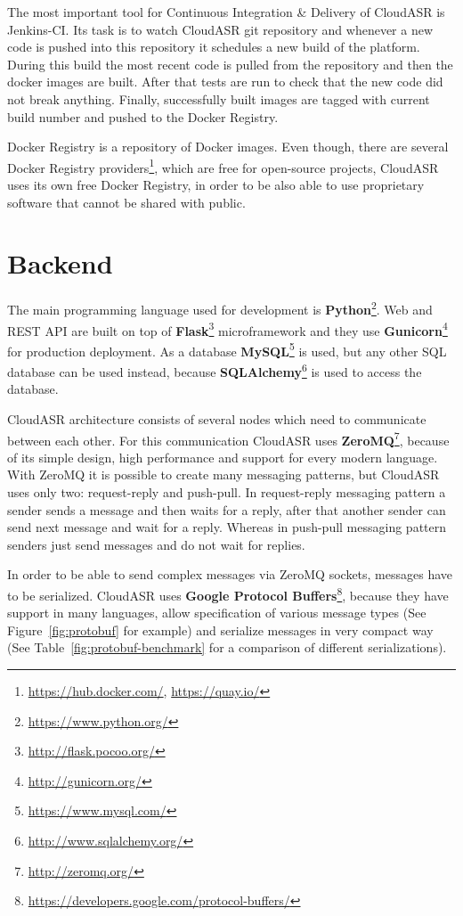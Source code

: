 The most important tool for Continuous Integration \& Delivery of CloudASR is Jenkins-CI.
Its task is to watch CloudASR git repository
  and whenever a new code is pushed into this repository it schedules a new build of the platform.
During this build the most recent code is pulled from the repository and then the docker images are built.
After that tests are run to check that the new code did not break anything.
Finally, successfully built images are tagged with current build number and pushed to the Docker Registry.


Docker Registry is a repository of Docker images.
Even though, there are several Docker Registry providers\footnote{\url{https://hub.docker.com/}, \url{https://quay.io/}},
  which are free for open-source projects,
  CloudASR uses its own free Docker Registry,
  in order to be also able to use proprietary software that cannot be shared with public.


\section{Backend}
The main programming language used for development is \textbf{Python}\footnote{\url{https://www.python.org/}}.
Web and REST API are built on top of \textbf{Flask}\footnote{\url{http://flask.pocoo.org/}} microframework
  and they use \textbf{Gunicorn}\footnote{\url{http://gunicorn.org/}} for production deployment.
As a database \textbf{MySQL}\footnote{\url{https://www.mysql.com/}} is used,
  but any other SQL database can be used instead,
  because \textbf{SQLAlchemy}\footnote{\url{http://www.sqlalchemy.org/}} is used to access the database.

CloudASR architecture consists of several nodes which need to communicate between each other.
For this communication CloudASR uses \textbf{ZeroMQ}\footnote{\url{http://zeromq.org/}},
  because of its simple design, high performance and support for every modern language.
With ZeroMQ it is possible to create many messaging patterns,
  but CloudASR uses only two: request-reply and push-pull.
In request-reply messaging pattern a sender sends a message and then waits for a reply,
  after that another sender can send next message and wait for a reply.
Whereas in push-pull messaging pattern senders just send messages and do not wait for replies.


In order to be able to send complex messages via ZeroMQ sockets, messages have to be serialized.
CloudASR uses \textbf{Google Protocol Buffers}\footnote{\url{https://developers.google.com/protocol-buffers/}},
  because they have support in many languages,
  allow specification of various message types (See Figure~\ref{fig:protobuf} for example)
  and serialize messages in very compact way
  (See Table~\ref{fig:protobuf-benchmark} for a comparison of different serializations).

